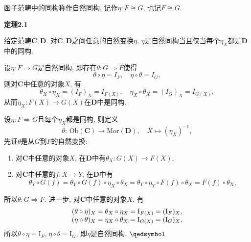 \documentclass[UTF8]{ctexart}
\begin{document}

\vspace{10pt}

函子范畴中的同构称作自然同构, 记作$\eta:F\cong G$, 也记$F\cong G$.

\vspace{10pt}

\hypertarget{sec:定理2.1}{}
\noindent\textbf{定理2.1}

给定范畴$\mathbf{C},\mathbf{D}$. 对$\mathbf{C},\mathbf{D}$之间任意的自然变换$\eta$,
$\eta$是自然同构当且仅当每个$\eta_X$都是$\mathbf{D}$中的同构.



设$\eta:F\Rightarrow G$是自然同构, 即存在$\theta:G\Rightarrow F$使得
\[
    \theta\circ\eta=I_F,\quad\eta\circ\theta=I_G,
\]
则对$\mathbf{C}$中任意的对象$X$, 有
\[
    \theta_X\circ\eta_X=(I_F)_X=I_{F(X)},\quad\eta_X\circ\theta_X=(I_G)_X=I_{G(X)},
\]
从而$\eta_X:F(X)\to G(X)$在$\mathbf{D}$中是同构.


设$\eta:F\Rightarrow G$且每个$\eta_X$都是同构, 则定义
\[
    \theta:\,\mathrm{Ob}(\mathbf{C})\to\mathrm{Mor}(\mathbf{D}),\quad
    X\mapsto(\eta_X)^{-1},
\]
先证$\theta$是从$G$到$F$的自然变换:
\begin{enumerate}
    \item 对$\mathbf{C}$中任意的对象$X$, 在$\mathbf{D}$中有$\theta_X:G(X)\to F(X)$,
    \item 对$\mathbf{C}$中任意的$f:X\to Y$, 在$\mathbf{D}$中有
    \[
        \theta_Y\circ G(f)=\theta_Y\circ G(f)\circ\eta_X\circ\theta_X=
        \theta_Y\circ\eta_Y\circ F(f)\circ\theta_X=F(f)\circ\theta_X,
    \]
\end{enumerate}
所以$\theta:G\Rightarrow F$. 进一步, 对$\mathbf{C}$中任意的对象$X$, 有
\vspace{3pt}
\[\begin{aligned}
    (\theta\circ\eta)_X=\theta_X\circ\eta_X=\mathrm{I}_{F(X)}
    =(\mathrm{I}_F)_X,\\[-3pt]
    (\eta\circ\theta)_X=\eta_X\circ\theta_X=\mathrm{I}_{G(X)}
    =(\mathrm{I}_G)_X,
\end{aligned}\vspace{3pt}\]
所以$\theta\circ\eta=\mathrm{I}_F,\,\eta\circ\theta=\mathrm{I}_G$,
即$\eta$是自然同构. \hfill $\qedsymbol$

\end{document}
